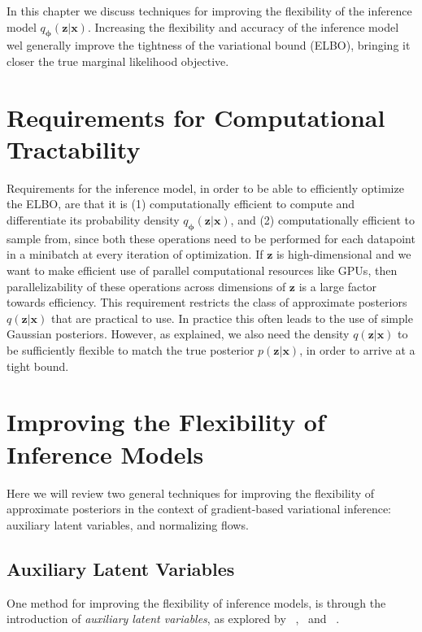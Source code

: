 \documentclass[MAL,biber]{nowfnt} %
\newcommand{\bb}[1]{\mathbf{#1}}
\newcommand{\bx}{\bb{x}}
\newcommand{\bz}{\bb{z}}
\newcommand{\bphi}{\boldsymbol{\phi}}
\newcommand{\qP}{q_{\bphi}}
\begin{document}
In this chapter we discuss techniques for improving the flexibility of the inference model $\qP(\bz|\bx)$. Increasing the flexibility and accuracy of the inference model wel generally improve the tightness of the variational bound (ELBO), bringing it closer the true marginal likelihood objective.

\section{Requirements for Computational Tractability}
\label{sec:comp_trac}
Requirements for the inference model, in order to be able to efficiently optimize the ELBO, are that it is (1) computationally efficient to compute and differentiate its probability density $\qP(\bz|\bx)$, and (2) computationally efficient to sample from, since both these operations need to be performed for each datapoint in a minibatch at every iteration of optimization. If $\bz$ is high-dimensional and we want to make efficient use of parallel computational resources like GPUs, then parallelizability of these operations across dimensions of $\bz$ is a large factor towards efficiency. This requirement restricts the class of approximate posteriors $q(\bz|\bx)$ that are practical to use. In practice this often leads to the use of simple Gaussian posteriors. However, as explained, we also need the density $q(\bz|\bx)$ to be sufficiently flexible to match the true posterior $p(\bz|\bx)$, in order to arrive at a tight bound.

\section{Improving the Flexibility of Inference Models}

Here we will review two general techniques for improving the flexibility of approximate posteriors in the context of gradient-based variational inference: auxiliary latent variables, and normalizing flows.

\subsection{Auxiliary Latent Variables}\label{sec:auxiliarylatents}

One method for improving the flexibility of inference models, is through the introduction of \emph{auxiliary latent variables}, as explored by ~\cite{salimans2015markov},~\citep{ranganath2016hierarchical} and ~\cite{maaloe2016auxiliary}.
\end{document}
